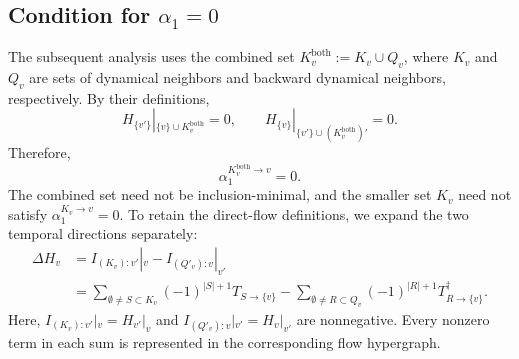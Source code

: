 \documentclass{comnet}%
\begin{document}
\subsection{\label{sec:Identification_Alpha1_Condition}Condition for $\alpha_{1} = 0$}
The subsequent analysis uses the combined set $K^{\mathrm{both}}_{v}:=K_v\cup Q_v$, where $K_v$ and $Q_v$ are sets of dynamical neighbors and backward dynamical neighbors, respectively. By their definitions,
\begin{equation}
 H_{\{v'\}}|_{\{v\}\cup K^{\mathrm{both}}_v}=0,
 \qquad H_{\{v\}}|_{\{v'\}\cup (K^{\mathrm{both}}_v)'}=0.
\end{equation}
Therefore,
\begin{equation}
 \alpha_1^{K^{\mathrm{both}}_v\to v}=0.
\end{equation}
The combined set need not be inclusion-minimal, and the smaller set $K_v$ need not satisfy $\alpha_1^{K_v\to v}=0$. To retain the direct-flow definitions, we expand the two temporal directions separately:
\begin{equation}\begin{aligned}\label{eq:Separate_Entropy_Balance}
 \Delta H_v
 &= I_{(K_v):v'}|_v-I_{(Q'_v):v}|_{v'}\\
 &=\sum_{\emptyset\ne S\subset K_v}(-1)^{|S|+1}T_{S\to\{v\}}
 -\sum_{\emptyset\ne R\subset Q_v}(-1)^{|R|+1}T^{\dagger}_{R\to\{v\}}.
\end{aligned}\end{equation}
Here, $I_{(K_v):v'}|_v=H_{v'}|_v$ and $I_{(Q'_v):v}|_{v'}=H_v|_{v'}$ are nonnegative. Every nonzero term in each sum is represented in the corresponding flow hypergraph.\\
\end{document}
